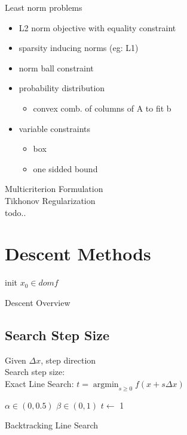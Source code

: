 \message{ !name(notebook.tex)}\documentclass[8pt]{report}
\DeclareMathOperator*{\argmin}{argmin}
\begin{document}
\begin{multicols*}{2}
  Least norm problems
  \begin{itemize}
  \item L2 norm objective with equality constraint
  \item sparsity inducing norms (eg: L1)
  \item norm ball constraint
  \item probability distribution
    \begin{itemize}
    \item convex comb. of columns of A to fit b
    \end{itemize}
  \item variable constraints
    \begin{itemize}
    \item box
    \item one sidded bound
    \end{itemize}
  \end{itemize}

  Multicriterion Formulation\\

  Tikhonov Regularization\\
  todo..
  
  \vfill\null
  
  \pagebreak

  \section{Descent Methods}

  \begin{algorithm}[H]
    init $x_0 \in dom f$\;
    \caption{Descent Overview\label{Descent}}
  \end{algorithm}
  
  \subsection{Search Step Size}
  Given $\Delta x$, step direction\\
  Search step size:\\
  Exact Line Search: $t = \argmin_{s\geq 0} f(x+s \Delta x)$\\

  \begin{algorithm}[H]
    $\alpha \in (0,0.5)$\;
    $\beta \in (0,1)$\;
    $t \leftarrow$ 1\;
    \caption{Backtracking Line Search\label{LS_BT}}
  \end{algorithm}


\end{multicols*}
\end{document}
